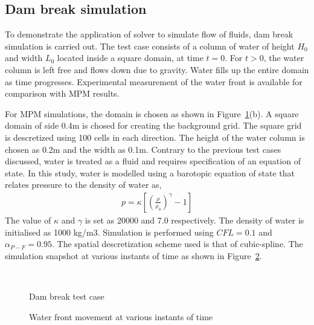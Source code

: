 \subsection{Dam break simulation}
To demonstrate the application of \Ex solver to simulate flow of fluids, dam break simulation is carried out. The test case consists of a column of water of height $H_0$ and width $L_0$ located inside a square domain, at time $t=0$. For $t>0$, the water column is left free and flows down due to gravity. Water fills up the entire domain as time progresses. Experimental measurement of the water front is available \cite{martin1952} for comparison with MPM results. 

For MPM simulations, the domain is chosen as shown in Figure~\ref{Fig:TestCaseDB}(b). A square domain of side 0.4m is chosed for creating the background grid. The square grid is descretized using 100 cells in each direction. The height of the water column is chosen as 0.2m and the width as 0.1m. Contrary to the previous test cases discussed, water is treated as a fluid and requires specification of an equation of state. In this study, water is modelled using a barotopic equation of state that relates pressure to the density of water as,
\begin{align}
p=\kappa\left[\left(\frac{\rho}{\rho_0}\right)^\gamma-1\right]
\end{align}
The value of $\kappa$ and $\gamma$ is set as 20000 and 7.0 respectively. The density of water is initialised as 1000 kg/m3. Simulation is performed using $CFL=0.1$ and $\alpha_{P-F}=0.95$. The spatial descretization scheme used is that of cubic-spline. The simulation snapshot at various instants of time as shown in Figure~\ref{Fig:TestCaseDB_Res1}. 


\begin{figure}[tbh]
\\
\caption{Dam break test case}
\label{Fig:TestCaseDB}
\end{figure}

\begin{figure}[h]
\caption{Water front movement at various instants of time}
\label{Fig:TestCaseDB_Res1}
\end{figure}

